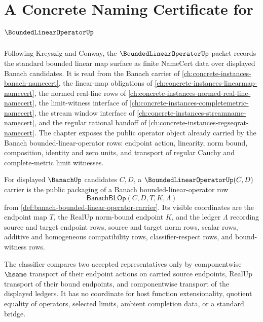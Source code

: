 \chapter{A Concrete Naming Certificate for $\BoundedLinearOperatorUp$}
\label{ch:concrete-instances-boundedlinearoperator-namecert}

Following Kreyszig and Conway, the $\BoundedLinearOperatorUp$ packet records the standard bounded linear map surface as finite NameCert data over displayed Banach candidates. It is read from the Banach carrier of \autoref{ch:concrete-instances-banach-namecert}, the linear-map obligations of \autoref{ch:concrete-instances-linearmap-namecert}, the normed real-line rows of \autoref{ch:concrete-instances-normed-real-line-namecert}, the limit-witness interface of \autoref{ch:concrete-instances-completemetric-namecert}, the stream window interface of \autoref{ch:concrete-instances-streamname-namecert}, and the regular rational handoff of \autoref{ch:concrete-instances-regseqrat-namecert}. The chapter exposes the public operator object already carried by the Banach bounded-linear-operator rows: endpoint action, linearity, norm bound, composition, identity and zero units, and transport of regular Cauchy and complete-metric limit witnesses.

\begin{definition}
\label{def:bounded-linear-operator-carrier}
For displayed $\BanachUp$ candidates $C,D$, a $\BoundedLinearOperatorUp(C,D)$ carrier is the public packaging of a Banach bounded-linear-operator row
$$
\mathsf{BanachBLOp}(C,D,T,K,\Lambda)
$$
from \autoref{def:banach-bounded-linear-operator-carrier}. Its visible coordinates are the endpoint map $T$, the RealUp norm-bound endpoint $K$, and the ledger $\Lambda$ recording source and target endpoint rows, source and target norm rows, scalar rows, additive and homogeneous compatibility rows, classifier-respect rows, and bound-witness rows.

The classifier compares two accepted representatives only by componentwise $\hsame$ transport of their endpoint actions on carried source endpoints, RealUp transport of their bound endpoints, and componentwise transport of the displayed ledgers. It has no coordinate for host function extensionality, quotient equality of operators, selected limits, ambient completion data, or a standard bridge.
\end{definition}

